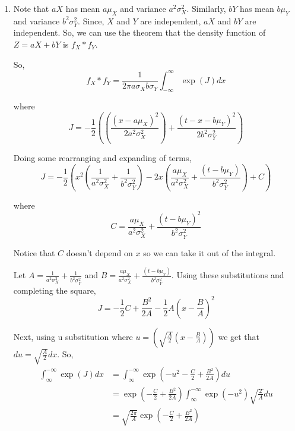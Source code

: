 \documentclass[12pt]{article}
\begin{document}

\begin{enumerate}[start=1,label={\bfseries Problem \arabic*:},leftmargin=1in] %
    \item Note that $aX$ has mean $a\mu_X$ and variance $a^2 \sigma_X^2$. Similarly, $bY$ has mean $b\mu_Y$ and variance $b^2 \sigma_Y^2$. 
    Since, $X$ and $Y$ are independent, $aX$ and $bY$ are independent. So, we can use the theorem that the density function of $Z = aX + bY$ 
    is $f_X \ast f_Y$. 

    So, \[ f_X \ast f_Y = \frac{1}{2\pi a\sigma_Xb\sigma_Y} \int^{\infty}_{-\infty} \exp(J)dx\]
    
    where 
    \[
        J = -\frac{1}{2}((\frac{(x- a\mu_X)^2}{2a^2\sigma_X^2}) + \frac{(t - x - b\mu_Y)^2}{2b^2\sigma_Y^2})
    \]

    Doing some rearranging and expanding of terms, 
    \[ 
        J = -\frac{1}{2}(x^2 (\frac{1}{a^2\sigma_X^2}+ \frac{1}{b^2\sigma_Y^2}) - 2x(\frac{a\mu_X}{a^2\sigma_X^2} + \frac{(t - b\mu_Y)}{b^2\sigma_Y^2}) + C)
    \]

    where 
    \[ 
        C = \frac{a\mu_X}{a^2\sigma_X^2} + \frac{(t - b\mu_Y)^2}{b^2\sigma_Y^2}
    \]

    Notice that $C$ doesn't depend on $x$ so we can take it out of the integral. 

    Let $A = \frac{1}{a^2\sigma_X^2} + \frac{1}{b^2\sigma_Y^2}$ and $B = \frac{a\mu_X}{a^2\sigma_X^2} + \frac{(t - b\mu_Y)}{b^2\sigma_Y^2}$. 
    Using these substitutions and completing the square, 
    \[ 
        J = - \frac{1}{2}C + \frac{B^2}{2A} - \frac{1}{2}A(x - \frac{B}{A})^2
    \]

    Next, using u substitution where $u = (\sqrt{\frac{A}{2}}(x-\frac{B}{A}))$ we get that $du = \sqrt{\frac{A}{2}}dx$. 
    So, 
    \begin{align*}
        \int_{\infty}^{-\infty} \exp(J)dx &= \int_{\infty}^{-\infty} \exp(-u^2 - \frac{C}{2} + \frac{B^2}{2A})du\\ 
         &= \exp(-\frac{C}{2} + \frac{B^2}{2A})\int_{\infty}^{-\infty} \exp(-u^2)\sqrt{\frac{2}{A}}du\\ 
        &= \sqrt{\frac{2\pi}{A}}\exp(-\frac{C}{2} + \frac{B^2}{2A})
    \end{align*}


\end{enumerate}
\end{document}
